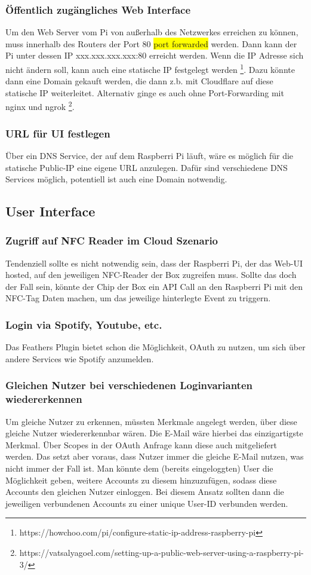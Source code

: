 \documentclass[10pt, a4paper, draft]{article}
\begin{document}
\subsubsection{Öffentlich zugängliches Web Interface}
Um den Web Server vom Pi von außerhalb des Netzwerkes erreichen zu können, muss innerhalb des Routers der Port 80 \colorbox{yellow}{port forwarded} werden.
Dann kann der Pi unter dessen IP xxx.xxx.xxx.xxx:80 erreicht werden.
Wenn die IP Adresse sich nicht ändern soll, kann auch eine statische IP festgelegt werden \footnote{https://howchoo.com/pi/configure-static-ip-address-raspberry-pi}. Dazu könnte dann eine Domain gekauft werden, die dann z.b. mit Cloudflare auf diese statische IP weiterleitet.
Alternativ ginge es auch ohne Port-Forwarding mit nginx und ngrok \footnote{https://vatsalyagoel.com/setting-up-a-public-web-server-using-a-raspberry-pi-3/}.

\subsubsection{URL für UI festlegen}
Über ein DNS Service, der auf dem Raspberri Pi läuft, wäre es möglich für die statische Public-IP eine eigene URL anzulegen.
Dafür sind verschiedene DNS Services möglich, potentiell ist auch eine Domain notwendig.

\subsection{User Interface}
\subsubsection{Zugriff auf NFC Reader im Cloud Szenario}
Tendenziell sollte es nicht notwendig sein, dass der Raspberri Pi, der das Web-UI hosted, auf den jeweiligen NFC-Reader der Box zugreifen muss.
Sollte das doch der Fall sein, könnte der Chip der Box ein API Call an den Raspberri Pi mit den NFC-Tag Daten machen, um das jeweilige hinterlegte Event zu triggern.

\subsubsection{Login via Spotify, Youtube, etc.}
Das Feathers Plugin bietet schon die Möglichkeit, OAuth zu nutzen, um sich über andere Services wie Spotify anzumelden.

\subsubsection{Gleichen Nutzer bei verschiedenen Loginvarianten wiedererkennen}
Um gleiche Nutzer zu erkennen, müssten Merkmale angelegt werden, über diese gleiche Nutzer wiedererkennbar wären.
Die E-Mail wäre hierbei das einzigartigste Merkmal. Über Scopes in der OAuth Anfrage kann diese auch mitgeliefert werden.
Das setzt aber voraus, dass Nutzer immer die gleiche E-Mail nutzen, was nicht immer der Fall ist.
Man könnte dem (bereits eingeloggten) User die Möglichkeit geben, weitere Accounts zu diesem hinzuzufügen, sodass diese Accounts den gleichen Nutzer einloggen.
Bei diesem Ansatz sollten dann die jeweiligen verbundenen Accounts zu einer unique User-ID verbunden werden.
\end{document}
